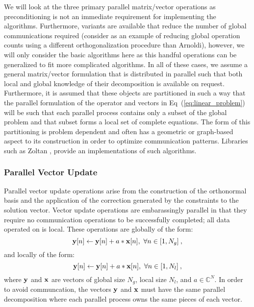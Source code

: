 We will look at the three primary parallel matrix/vector operations as
preconditioning is not an immediate requirement for implementing the
algorithms. Furthermore, variants are available that reduce the number
of global communications required (consider \cite{sosonkina_1998} as
an example of reducing global operation counts using a different
orthogonalization procedure than Arnoldi), however, we will only
consider the basic algorithms here as this handful operations can be
generalized to fit more complicated algorithms. In all of these cases,
we assume a general matrix/vector formulation that is distributed in
parallel such that both local and global knowledge of their
decomposition is available on request. Furthermore, it is assumed that
these objects are partitioned in such a way that the parallel
formulation of the operator and vectors in
Eq~(\ref{eq:linear_problem}) will be such that each parallel process
contains only a subset of the global problem and that subset forms a
local set of complete equations. The form of this partitioning is
problem dependent and often has a geometric or graph-based aspect to
its construction in order to optimize communication
patterns. Libraries such as Zoltan \citep{zoltan_2007}, provide an
implementations of such algorithms.

\subsubsection{Parallel Vector Update}
\label{subsubsec:parallel_vec_update}
Parallel vector update operations arise from the construction of the
orthonormal basis and the application of the correction generated by
the constraints to the solution vector. Vector update operations are
embarassingly parallel in that they require no communication
operations to be successfully completed; all data operated on is
local. These operations are globally of the form:
\begin{equation}
  \ve{y}[n] \leftarrow \ve{y}[n] + a * \ve{x}[n],\ \forall n \in [1,N_g]
  \:,
  \label{eq:global_vector_update}
\end{equation}
and locally of the form:
\begin{equation}
  \mathbf{y}[n] \leftarrow \mathbf{y}[n] + a * \mathbf{x}[n],\ \forall n \in [1,N_l]
  \:,
  \label{eq:local_vector_update}
\end{equation}
where $\mathbf{y}$ and $\mathbf{x}$ are vectors of global size $N_g$, local
size $N_l$, and $a \in \mathbb{C}^N$. In order to avoid communcation,
the vectors $\mathbf{y}$ and $\mathbf{x}$ must have the same parallel
decomposition where each parallel process owns the same pieces of each
vector. 

